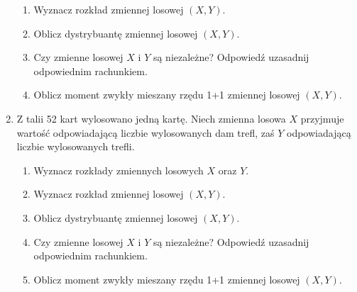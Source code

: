 \documentclass{mwart}
\newcommand{\ans}[1]{}
\begin{document}
\begin{enumerate}
\begin{enumerate}
\item Wyznacz rozkład zmiennej losowej $(X,Y)$. \ans{$P(0,0)=\frac{36}{52} P(1,0)=\frac{3}{52} P(0,1)=\frac{12}{52} P(1,1)=\frac{1}{52}$}
\item Oblicz dystrybuantę zmiennej losowej $(X,Y)$. \ans{\[F(u,v)=\begin{cases} 
	0 & u\leq 0 \lor v\leq 0 \\ 
	\frac{36}{52} & 0<u\leq 1 \land 0<v\leq 1 \\
	\frac{39}{52} & u>1 \land 0<v\leq 1 \\
	\frac{48}{52} & 0<u\leq 1 \land v>1 \\
	1 & u>1 \land v>1
	\end{cases}\]}
\item Czy zmienne losowej $X$ i $Y$ są niezależne? Odpowiedź uzasadnij odpowiednim rachunkiem. \ans{Tak}
\item Oblicz moment zwykły mieszany rzędu 1+1 zmiennej losowej $(X,Y)$. \ans{$EXY=\frac{1}{52}$}
\end{enumerate}
\item Z talii 52 kart wylosowano jedną kartę. Niech zmienna losowa $X$ przyjmuje wartość odpowiadającą liczbie wylosowanych dam trefl, zaś $Y$ odpowiadającą liczbie wylosowanych trefli.
\begin{enumerate}
\item Wyznacz rozkłady zmiennych losowych $X$ oraz $Y$. \ans{$P(X=0)=\frac{51}{52} P(X=1)=\frac{1}{52} P(Y=1)=\frac{13}{52} P(Y=0)=\frac{39}{52}$}
\item Wyznacz rozkład zmiennej losowej $(X,Y)$. \ans{$P(0,0)=\frac{39}{52} P(1,0)=0 P(0,1)=\frac{12}{52} P(1,1)=\frac{1}{52}$}
\item Oblicz dystrybuantę zmiennej losowej $(X,Y)$.
\item Czy zmienne losowej $X$ i $Y$ są niezależne? Odpowiedź uzasadnij odpowiednim rachunkiem. \ans{Nie, $0=P(1,0)\neq P(X=1)P(Y=0)=\frac{39}{52^2}$}
\item Oblicz moment zwykły mieszany rzędu 1+1 zmiennej losowej $(X,Y)$. \ans{$EXY=\frac{1}{52}$}

\end{enumerate}
\end{enumerate}
\end{document}
